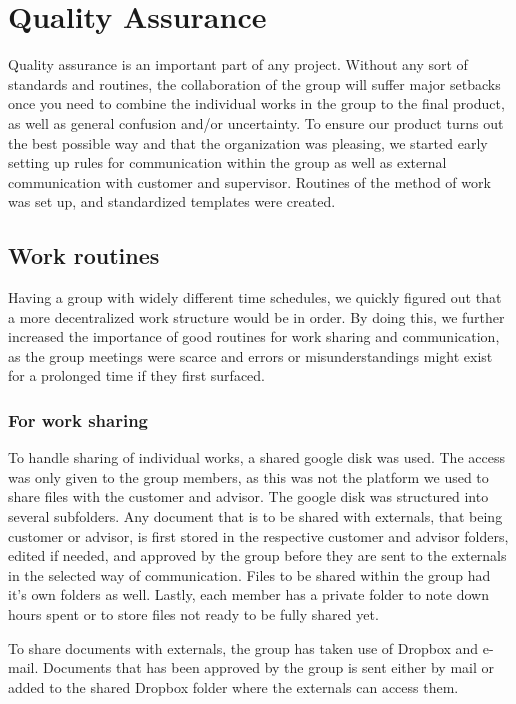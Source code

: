 \documentclass[11pt]{book}
\begin{document}
\section{Quality Assurance}
Quality assurance is an important part of any project. Without any sort of standards and routines, the collaboration of the group will suffer major setbacks once you need to combine the individual works in the group to the final product, as well as general confusion and/or uncertainty. To ensure our product turns out the best possible way and that the organization was pleasing, we started early setting up rules for communication within the group as well as external communication with customer and supervisor. Routines of the method of work was set up, and standardized templates were created.

\subsection{Work routines}
Having a group with widely different time schedules, we quickly figured out that a more decentralized work structure would be in order. By doing this, we further increased the importance of good routines for work sharing and communication, as the group meetings were scarce and errors or misunderstandings might exist for a prolonged time if they first surfaced.

\subsubsection{For work sharing}
To handle sharing of individual works, a shared google disk was used. The access was only given to the group members, as this was not the platform we used to share files with the customer and advisor. The google disk was structured into several subfolders. Any document that is to be shared with externals, that being customer or advisor, is first stored in the respective customer and advisor folders, edited if needed, and approved by the group before they are sent to the externals in the selected way of communication. Files to be shared within the group had it's own folders as well. Lastly, each member has a private folder to note down hours spent or to store files not ready to be fully shared yet.

To share documents with externals, the group has taken use of Dropbox and e-mail. Documents that has been approved by the group is sent either by mail or added to the shared Dropbox folder where the externals can access them.
\end{document}
